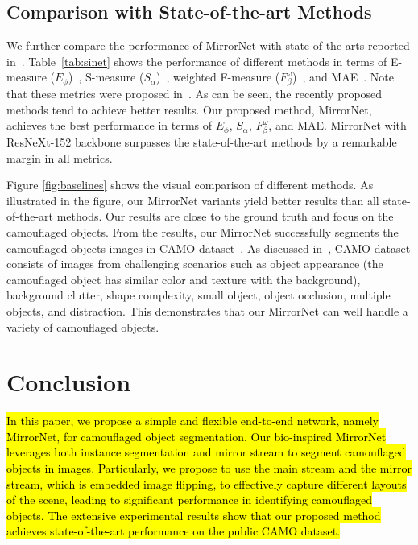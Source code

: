 \documentclass[journal]{IEEEtran}
\DeclareRobustCommand{\hlcyan}[1]{{\sethlcolor{white}\hl{#1}}}
\begin{document}
\subsection{Comparison with State-of-the-art Methods}
We further compare the performance of MirrorNet with state-of-the-arts reported in~\cite{sinet}. Table~\ref{tab:sinet} shows the performance of different methods in terms of E-measure ($E_{\phi}$)~\cite{ephi},  S-measure ($S_{\alpha}$)~\cite{smeasure}, weighted F-measure ($F_{\beta}^{\omega}$)~\cite{weightedf}, and MAE~\cite{CAMO}. Note that these metrics were proposed in~\cite{sinet}. As can be seen, the recently proposed methods tend to achieve better results. Our proposed method, MirrorNet, achieves the best performance in terms of $E_{\phi}$,  $S_{\alpha}$, $F_{\beta}^{\omega}$, and MAE. MirrorNet with ResNeXt-152 backbone surpasses the state-of-the-art methods by a remarkable margin in all metrics. 





Figure \ref{fig:baselines} shows the visual comparison of different methods. As illustrated in the figure, our MirrorNet variants yield better results than all state-of-the-art methods. Our results are close to the ground truth and focus on the camouflaged objects. From the results, our MirrorNet successfully segments the camouflaged objects images in CAMO dataset~\cite{CAMO}. As discussed in~\cite{CAMO}, CAMO dataset consists of images from challenging scenarios such as object appearance (the camouflaged object has similar color and texture with the background), background clutter, shape complexity, small object, object occlusion, multiple objects, and distraction. This demonstrates that our MirrorNet can well handle a variety of camouflaged objects. 

\section{Conclusion}
\label{sec:conclusion}

\hlcyan{In this paper, we propose a simple and flexible end-to-end network, namely MirrorNet, for camouflaged object segmentation. Our bio-inspired MirrorNet leverages both instance segmentation and mirror stream to segment camouflaged objects in images. Particularly, we propose to use the main  stream and the mirror stream, which is embedded image flipping, to effectively capture different layouts of the scene, leading to significant performance in identifying camouflaged objects. The extensive experimental results show that our proposed method achieves state-of-the-art performance on the public CAMO dataset.}
\end{document}
